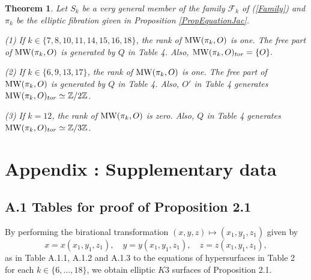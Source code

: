 \documentclass[10pt]{article}
\newtheorem{thm}{Theorem}[section]
\begin{document}
\begin{thm}\label{ThmMW}
Let $S_k$ be a very general member of the family $\mathscr{F}_k$ of (\ref{Family})
and $\pi_k$ be the elliptic fibration given in Proposition \ref{PropEquationJac}.

(1) If $k\in \{7,8,10,11,14,15,16,18\}$,
the rank of ${\rm MW}(\pi_k, O)$ is one. 
The free part of ${\rm MW}(\pi_k, O)$ is generated by $Q$ in Table 4. 
Also, ${\rm MW}(\pi_k, O)_{tor}=\{O\}.$

(2) If $k\in \{6,9,13,17\}$,
the rank of ${\rm MW}(\pi_k, O)$ is one. 
The free part of ${\rm MW}(\pi_k, O)$ is generated by $Q$ in Table 4. 
Also, $O'$ in Table 4 generates ${\rm MW}(\pi_k, O)_{tor} \simeq \mathbb{Z}/2\mathbb{Z}$. 

(3) If $k=12$,
the rank of ${\rm MW}(\pi_k, O)$ is zero. 
Also, $Q$ in Table 4 generates ${\rm MW}(\pi_k, O)_{tor}\simeq \mathbb{Z}/3\mathbb{Z}$. 
\end{thm}

 
 
 
 
 \section*{Appendix : Supplementary data}
 
 
 
 \subsection*{A.1 Tables  for  proof of Proposition 2.1}

By performing the birational transformation $(x,y,z)\mapsto (x_1,y_1,z_1)$ given by
$$
x=x(x_1,y_1,z_1), \quad y=y(x_1,y_1,z_1), \quad z=z(x_1,y_1,z_1),
$$
as in Table A.1.1, A.1.2 and A.1.3 to the equations of hypersurfaces in Table 2 
for each $k \in \{6,\ldots,18\}$,
we obtain elliptic $K3$ surfaces of Proposition 2.1.
\end{document}

